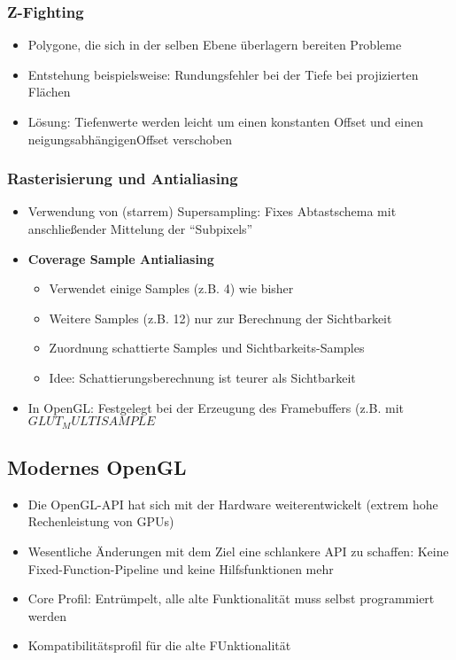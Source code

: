 \subsubsection{Z-Fighting}
\begin{itemize}
	\item Polygone, die sich in der selben Ebene überlagern bereiten Probleme
	\item Entstehung beispielsweise: Rundungsfehler bei der Tiefe bei projizierten Flächen
	\item Lösung: Tiefenwerte werden leicht um einen konstanten Offset und einen neigungsabhängigenOffset verschoben
\end{itemize}

\subsubsection{Rasterisierung und Antialiasing}
\begin{itemize}
	\item Verwendung von (starrem) Supersampling: Fixes Abtastschema mit anschließender Mittelung der "`Subpixels"'
	\item \textbf{Coverage Sample Antialiasing}
	\begin{itemize}
		\item Verwendet einige Samples (z.B. 4) wie bisher
		\item Weitere Samples (z.B. 12) nur zur Berechnung der Sichtbarkeit
		\item Zuordnung schattierte Samples und Sichtbarkeits-Samples
		\item Idee: Schattierungsberechnung ist teurer als Sichtbarkeit
	\end{itemize}
	\item In OpenGL: Festgelegt bei der Erzeugung des Framebuffers (z.B. mit \(GLUT_MULTISAMPLE\)
\end{itemize}


\subsection{Modernes OpenGL}
\begin{itemize}
	\item Die OpenGL-API hat sich mit der Hardware weiterentwickelt (extrem hohe Rechenleistung von GPUs)
	\item Wesentliche Änderungen mit dem Ziel eine schlankere API zu schaffen: Keine Fixed-Function-Pipeline und keine Hilfsfunktionen mehr
	\item Core Profil: Entrümpelt, alle alte Funktionalität muss selbst programmiert werden
	\item Kompatibilitätsprofil für die alte FUnktionalität
\end{itemize}

